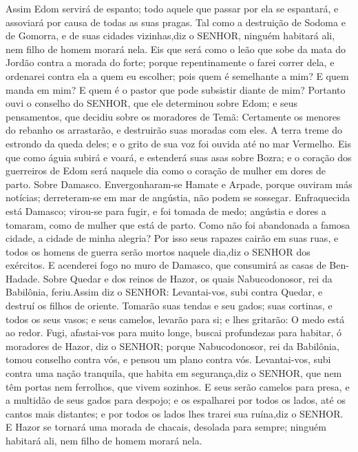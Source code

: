 {Assim Edom servirá de espanto; todo aquele que passar por ela se espantará, e assoviará por causa de todas as suas pragas.
Tal como a destruição de Sodoma e de Gomorra, e de suas cidades vizinhas,diz o SENHOR, ninguém habitará ali, nem filho de homem morará nela.
Eis que será como o leão que sobe da mata do Jordão contra a morada do forte; porque repentinamente o farei correr dela, e ordenarei contra ela a quem eu escolher; pois quem é semelhante a mim? E quem manda em mim? E quem é o pastor que pode subsistir diante de mim?
Portanto ouvi o conselho do SENHOR, que ele determinou sobre Edom; e seus pensamentos, que decidiu sobre os moradores de Temã: Certamente os menores do rebanho os arrastarão, e destruirão suas moradas com eles.
A terra treme do estrondo da queda deles; e o grito de sua voz foi ouvida até no mar Vermelho.
Eis que como águia subirá e voará, e estenderá suas asas sobre Bozra; e o coração dos guerreiros de Edom será naquele dia como o coração de mulher em dores de parto.
Sobre Damasco. Envergonharam-se Hamate e Arpade, porque ouviram más notícias; derreteram-se em mar de angústia, não podem se sossegar.
Enfraquecida está Damasco; virou-se para fugir, e foi tomada de medo; angústia e dores a tomaram, como de mulher que está de parto.
Como não foi abandonada a famosa cidade, a cidade de minha alegria?
Por isso seus rapazes cairão em suas ruas, e todos os homens de guerra serão mortos naquele dia,diz o SENHOR dos exércitos.
E acenderei fogo no muro de Damasco, que consumirá as casas de Ben-Hadade.
Sobre Quedar e dos reinos de Hazor, os quais Nabucodonosor, rei da Babilônia, feriu.Assim diz o SENHOR: Levantai-vos, subi contra Quedar, e destruí os filhos de oriente.
Tomarão suas tendas e seu gados; suas cortinas, e todos os seus vasos; e seus camelos, levarão para si; e lhes gritarão: O medo está ao redor.
Fugi, afastai-vos para muito longe, buscai profundezas para habitar, ó moradores de Hazor, diz o SENHOR; porque Nabucodonosor, rei da Babilônia, tomou conselho contra vós, e pensou um plano contra vós.
Levantai-vos, subi contra uma nação tranquila, que habita em segurança,diz o SENHOR, que nem têm portas nem ferrolhos, que vivem sozinhos.
E seus serão camelos para presa, e a multidão de seus gados para despojo; e os espalharei por todos os lados, até os cantos mais distantes;
 e por todos os lados lhes trarei sua ruína,diz o SENHOR.
E Hazor se tornará uma morada de chacais, desolada para sempre; ninguém habitará ali, nem filho de homem morará nela.
}
